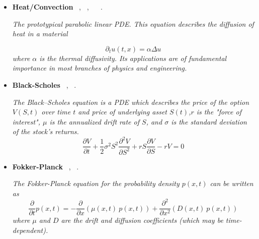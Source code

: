 \documentclass[12pt,letterpaper]{article}
\begin{document}
\begin{itemize}
\begin{itemize}
\begin{itemize}
\begin{itemize}
                        \item \textbf{Heat/Convection} ~\cite{leongVariationalQuantumEvolution2022,albinoSolvingPartialDifferential2022}, ~\cite{liuApplicationVariationalHybrid2022},  ~\cite{lindenQuantumVsClassical2022,jinQuantumSimulationPartial2022,jinTimeComplexityAnalysis2022a} ~\cite{jinQuantumSimulationPartial2022a}.

                        \textit{The prototypical parabolic linear PDE. This equation describes the diffusion of heat in a material}

                        $$\partial_t u(t,x) = \alpha \Delta u $$
                        \textit{where $\alpha$ is the thermal diffusivity. Its applications are of fundamental importance in most branches of physics and engineering. }
                    
            			\item \textbf{Black-Scholes} ~\cite{fontanelaShortCommunicationQuantum2021,miyamotoPricingMultiAssetDerivatives2022},  ~\cite{jinQuantumSimulationPartial2022a,anQuantumacceleratedMultilevelMonte2021}.
               
                        \textit{The Black–Scholes equation is a PDE which describes the price of the option $V(S,t)$ over time $t$ and price of underlying asset $S(t)$,$r$ is the "force of interest", $\mu$ is the annualized drift rate of $S$, and $\sigma$ is the standard deviation of the stock's returns.}
                        $$
                        \frac{\partial V}{\partial t}+\frac{1}{2} \sigma^2 S^2 \frac{\partial^2 V}{\partial S^2}+r S \frac{\partial V}{\partial S}-r V=0
                        $$

                        \item \textbf{Fokker-Planck}  ~\cite{jinQuantumSimulationPartial2022a},  ~\cite{garcia-ripollQuantuminspiredAlgorithmsMultivariate2021}.
                        
                        \textit{The Fokker-Planck equation for the probability density $p(x,t)$ can be written as}
                        $$ \dfrac{\partial }{\partial t} p(x,t)  = - \dfrac{\partial }{\partial x} \left( \mu(x,t)~p(x,t)  \right) + \dfrac{\partial^2 }{\partial x^2} \left( D(x,t)~p(x,t)  \right)$$
                        \textit{where $\mu$ and $D$ are the drift and diffusion coefficients (which may be time-dependent).}
                        

\end{itemize}
\end{itemize}
\end{itemize}
\end{itemize}
\end{document}
